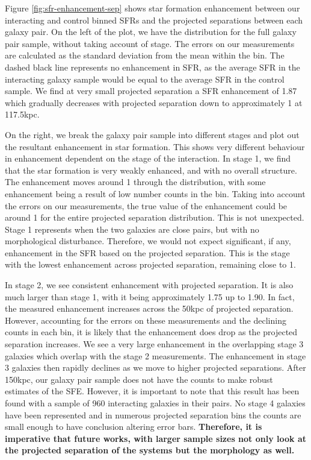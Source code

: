 Figure \ref{fig:sfr-enhancement-sep} shows star formation enhancement between our interacting and control binned SFRs and the projected separations between each galaxy pair. On the left of the plot, we have the distribution for the full galaxy pair sample, without taking account of stage. The errors on our measurements are calculated as the standard deviation from the mean within the bin. The dashed black line represents no enhancement in SFR, as the average SFR in the interacting galaxy sample would be equal to the average SFR in the control sample. We find at very small projected separation a SFR enhancement of 1.87 which gradually decreases with projected separation down to approximately 1 at 117.5kpc. 

On the right, we break the galaxy pair sample into different stages and plot out the resultant enhancement in star formation. This shows very different behaviour in enhancement dependent on the stage of the interaction. In stage 1, we find that the star formation is very weakly enhanced, and with no overall structure. The enhancement moves around 1 through the distribution, with some enhancement being a result of low number counts in the bin. Taking into account the errors on our measurements, the true value of the enhancement could be around 1 for the entire projected separation distribution. This is not unexpected. Stage 1 represents when the two galaxies are close pairs, but with no morphological disturbance. Therefore, we would not expect significant, if any, enhancement in the SFR based on the projected separation. This is the stage with the lowest enhancement across projected separation, remaining close to 1.

In stage 2, we see consistent enhancement with projected separation. It is also much larger than stage 1, with it being approximately 1.75 up to 1.90. In fact, the measured enhancement increases across the 50kpc of projected separation. However, accounting for the errors on these measurements and the declining counts in each bin, it is likely that the enhancement does drop as the projected separation increases. We see a very large enhancement in the overlapping stage 3 galaxies which overlap with the stage 2 measurements. The enhancement in stage 3 galaxies then rapidly declines as we move to higher projected separations. After 150kpc, our galaxy pair sample does not have the counts to make robust estimates of the SFE. However, it is important to note that this result has been found with a sample of 960 interacting galaxies in their pairs. No stage 4 galaxies have been represented and in numerous projected separation bins the counts are small enough to have conclusion altering error bars. \textbf{Therefore, it is imperative that future works, with larger sample sizes not only look at the projected separation of the systems but the morphology as well.}

